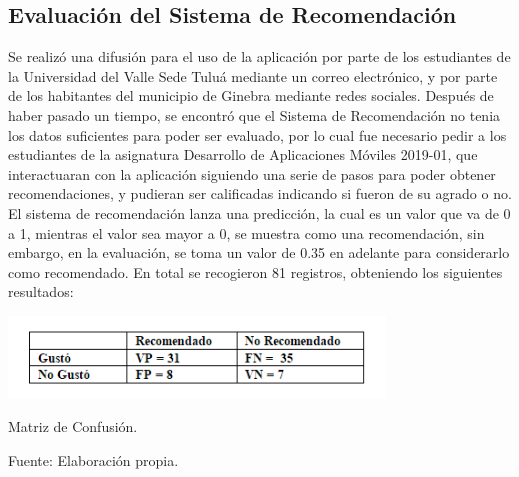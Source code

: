 \documentclass[12pt,letterpaper,openany]{book}
\begin{document}
\subsection{Evaluación del Sistema de Recomendación}
Se realizó una difusión para el uso de la aplicación por parte de los estudiantes de la Universidad del Valle Sede Tuluá mediante un correo electrónico, y por parte de los habitantes del municipio de Ginebra mediante redes sociales.
Después de haber pasado un tiempo, se encontró que el Sistema de Recomendación no tenia los datos suficientes para poder ser evaluado, por lo cual fue necesario pedir a los estudiantes de la asignatura Desarrollo de Aplicaciones Móviles 2019-01, que interactuaran con la aplicación siguiendo una serie de pasos para poder obtener recomendaciones, y pudieran ser calificadas indicando si fueron de su agrado o no.
\vspace{5mm}\newline
El sistema de recomendación lanza una predicción, la cual es un valor que va de 0 a 1, mientras el valor sea mayor a 0, se muestra como una recomendación, sin embargo, en la evaluación, se toma un valor de 0.35 en adelante para considerarlo como recomendado. 
\vspace{5mm}\newline
En total se recogieron 81 registros, obteniendo los siguientes resultados:

\begin{table}[H]
\centering
\includegraphics[width=10cm]{./imagenes/PrecisionRecall}
\caption{Matriz de Confusión.}
\centering Fuente: Elaboración propia.
\end{table}
\end{document}
